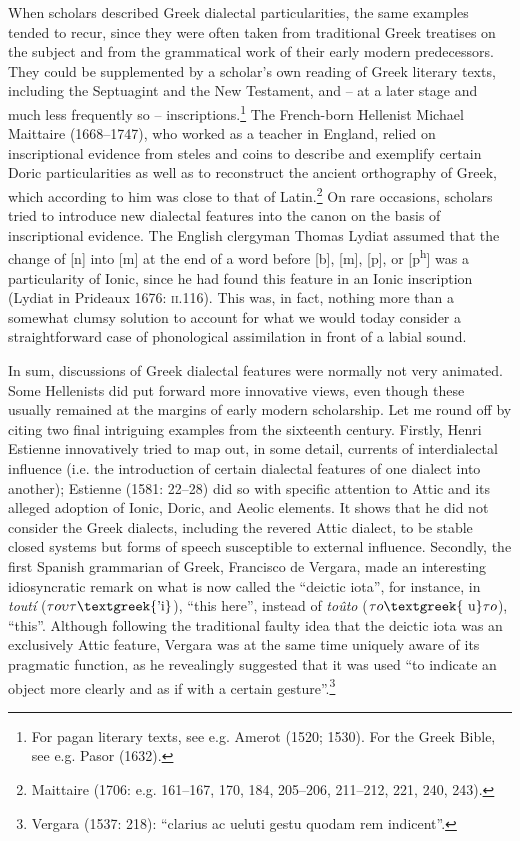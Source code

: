 \begin{styleStandard}
When scholars described Greek dialectal particularities, the same examples tended to recur, since they were often taken from traditional Greek treatises on the subject and from the grammatical work of their early modern predecessors. They could be supplemented by a scholar’s own reading of Greek literary texts, including the Septuagint and the New Testament, and – at a later stage and much less frequently so – inscriptions.\footnote{ For pagan literary texts, see e.g. Amerot (1520; 1530). For the Greek Bible, see e.g. Pasor (1632).} The French-born Hellenist Michael Maittaire (1668–1747), who worked as a teacher in England, relied on inscriptional evidence from steles and coins to describe and exemplify certain Doric particularities as well as to reconstruct the ancient orthography of Greek, which according to him was close to that of Latin.\footnote{ Maittaire (1706: e.g. 161–167, 170, 184, 205–206, 211–212, 221, 240, 243).} On rare occasions, scholars tried to introduce new dialectal features into the canon on the basis of inscriptional evidence. The English clergyman Thomas Lydiat assumed that the change of [n] into [m] at the end of a word before [b], [m], [p], or [p\textsuperscript{h}] was a particularity of Ionic, since he had found this feature in an Ionic inscription (Lydiat in Prideaux 1676: \textsc{ii}.116). This was, in fact, nothing more than a somewhat clumsy solution to account for what we would today consider a straightforward case of phonological assimilation in front of a labial sound.
\end{styleStandard}

\begin{styleStandard}
In sum, discussions of Greek dialectal features were normally not very animated. Some Hellenists did put forward more innovative views, even though these usually remained at the margins of early modern scholarship. Let me round off by citing two final intriguing examples from the sixteenth century. Firstly, Henri Estienne innovatively tried to map out, in some detail, currents of interdialectal influence (i.e. the introduction of certain dialectal features of one dialect into another); Estienne (1581: 22–28) did so with specific attention to Attic and its alleged adoption of Ionic, Doric, and Aeolic elements. It shows that he did not consider the Greek dialects, including the revered Attic dialect, to be stable closed systems but forms of speech susceptible to external influence. Secondly, the first Spanish grammarian of Greek, Francisco de Vergara, made an interesting idiosyncratic remark on what is now called the “deictic iota”, for instance, in \textit{toutí }($\tau o\upsilon \tau \text{\textgreek{'i}}$), “this here”, instead of \textit{toûto} ($\tau o\text{\textgreek{~u}}\tau o$), “this”. Although following the traditional faulty idea that the deictic iota was an exclusively Attic feature, Vergara was at the same time uniquely aware of its pragmatic function, as he revealingly suggested that it was used “to indicate an object more clearly and as if with a certain gesture”.\footnote{ Vergara (1537: 218): “clarius ac ueluti gestu quodam rem indicent”.}
\end{styleStandard}

